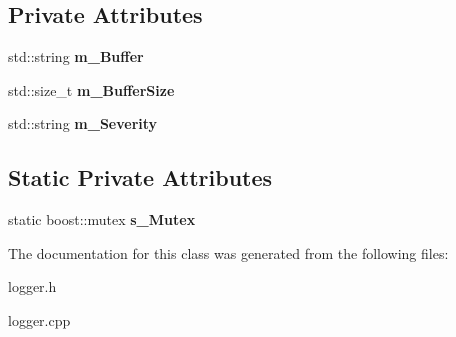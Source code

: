 \subsection*{\-Private \-Attributes}
\begin{DoxyCompactItemize}
\item 
\hypertarget{classengine_1_1cLogger_a49256d8a7c8856b228154aa274b05a28}{
std\-::string {\bfseries m\-\_\-\-Buffer}}
\label{classengine_1_1cLogger_a49256d8a7c8856b228154aa274b05a28}

\item 
\hypertarget{classengine_1_1cLogger_a6d430535ace3793cc49be69497ee8c9d}{
std\-::size\-\_\-t {\bfseries m\-\_\-\-Buffer\-Size}}
\label{classengine_1_1cLogger_a6d430535ace3793cc49be69497ee8c9d}

\item 
\hypertarget{classengine_1_1cLogger_a8214e9c0a088dbb98a4f4ea7ca9b9351}{
std\-::string {\bfseries m\-\_\-\-Severity}}
\label{classengine_1_1cLogger_a8214e9c0a088dbb98a4f4ea7ca9b9351}

\end{DoxyCompactItemize}
\subsection*{\-Static \-Private \-Attributes}
\begin{DoxyCompactItemize}
\item 
\hypertarget{classengine_1_1cLogger_a5276c31bbf002c5a224095504bac62c5}{
static boost\-::mutex {\bfseries s\-\_\-\-Mutex}}
\label{classengine_1_1cLogger_a5276c31bbf002c5a224095504bac62c5}

\end{DoxyCompactItemize}


\-The documentation for this class was generated from the following files\-:\begin{DoxyCompactItemize}
\item 
logger.\-h\item 
logger.\-cpp\end{DoxyCompactItemize}
